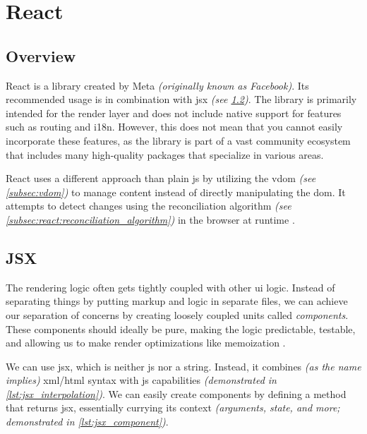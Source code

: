 \section{React}
\label{sec:react}

\subsection{Overview}
\label{subsec:react:overview}

React is a \gls{library} \cite{lagadritu:limitations_react} created by Meta \textit{(originally known as Facebook)}. Its recommended usage is in combination with \acrshort{jsx} \cite{react:introduction_jsx} \textit{(see \ref{subsec:jsx})}.
The library is primarily intended for the render layer and does not include native support for features such as routing and \acrshort{i18n}. However, this does not mean that you cannot easily incorporate these features, as the library is part of a vast community ecosystem that includes many high-quality packages that specialize in various areas.

React uses a different approach than plain \acrlong{js} by utilizing the \acrshort{vdom} \cite{react:vdom} \textit{(see \ref{subsec:vdom})} to manage content instead of directly manipulating the \acrshort{dom}. It attempts to detect changes using the reconciliation algorithm \textit{(see \ref{subsec:react:reconciliation_algorithm})} in the browser at runtime \cite{react:reconciliation}.

\subsection{JSX}
\label{subsec:jsx}

The rendering logic often gets tightly coupled with other \acrshort{ui} logic. Instead of separating things by putting markup and logic in separate files, we can achieve our separation of concerns \cite{enwiki:separation_of_concerns} by creating loosely coupled units called \textsl{components}. These components should ideally be pure, making the logic predictable, testable, and allowing us to make render optimizations like memoization \cite{enwiki:pure_function, react:keeping_components_pure}.

We can use \acrfull{jsx}, which is neither \acrshort{js} nor a string. Instead, it combines \textit{(as the name implies)} \acrshort{xml}/\acrshort{html} syntax with \acrshort{js} capabilities \textit{(demonstrated in \autoref{lst:jsx_interpolation})}. We can easily create components by defining a method that returns \acrshort{jsx}, essentially currying \cite{enwiki:currying} its context \textit{(arguments, state, and more; demonstrated in \autoref{lst:jsx_component})}.

